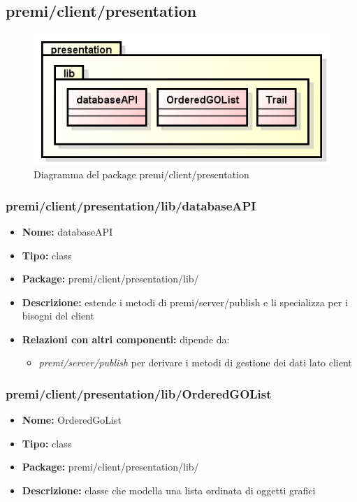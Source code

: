 \subsection{premi/client/presentation}
\begin{figure}[!h]
\begin{center}
\includegraphics[scale=0.45]{img/diapkg/presentation.png}
\caption{Diagramma del package premi/client/presentation}
\end{center}
\end{figure}


\subsubsection{premi/client/presentation/lib/databaseAPI}
\begin{itemize}
  \item[] \textbf{Nome:} databaseAPI
  \item[] \textbf{Tipo:} class
  \item[] \textbf{Package:} premi/client/presentation/lib/
  \item[] \textbf{Descrizione:} estende i metodi di premi/server/publish e li specializza per i bisogni del client
   \item[] \textbf{Relazioni con altri componenti:} dipende da:
 \begin{itemize}
 \item \textit{premi/server/publish} per derivare i metodi di gestione dei dati lato client
 \end{itemize}
\end{itemize}


\subsubsection{premi/client/presentation/lib/OrderedGOList}
\begin{itemize}
  \item[] \textbf{Nome:} OrderedGoList
  \item[] \textbf{Tipo:} class
  \item[] \textbf{Package:} premi/client/presentation/lib/
  \item[] \textbf{Descrizione:} classe che modella una lista ordinata di oggetti grafici
\end{itemize}
  
